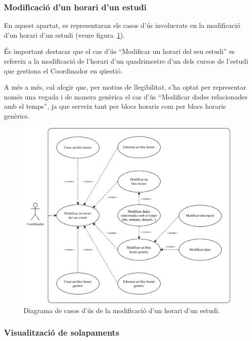 \documentclass[a4paper,12pt]{ThesisStyle}
\begin{document}
\subsubsection{Modificació d'un horari d'un estudi}

En aquest apartat, es representaran els casos d'ús involucrats en la modificació d'un horari d'un estudi (veure figura~\ref{img:casos_us_horaris_modif}).

És important destacar que el cas d'ús ``Modificar un horari del seu estudi'' es refereix a la modificació de l'horari d'un quadrimestre d'un dels cursos de l'estudi que gestiona el Coordinador en qüestió.

A més a més, cal afegir que, per motius de llegibilitat, s'ha optat per representar només una vegada i de manera genèrica el cas d'ús ``Modificar dades relacionades amb el temps'', ja que serveix tant per blocs horaris com per blocs horaris genèrics.

\begin{figure}[H]
  \centering
  \includegraphics[width=\textwidth]{assets/use_cases/horaris/modificar/modif.pdf}
  \caption{\label{img:casos_us_horaris_modif}Diagrama de casos d'ús de la modificació d'un horari d'un estudi.}
\end{figure}

\subsubsection{Visualització de solapaments}
\end{document}
